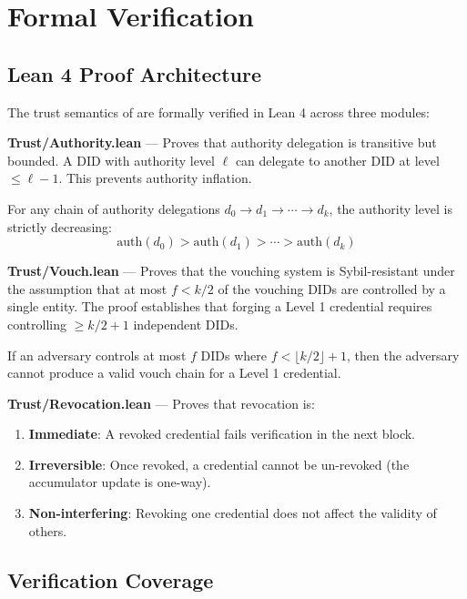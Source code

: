 \section{Formal Verification}


\subsection{Lean 4 Proof Architecture}

The trust semantics of \IChain{} are formally verified in Lean 4 across three modules:

\textbf{Trust/Authority.lean} --- Proves that authority delegation is transitive but bounded. A DID with authority level $\ell$ can delegate to another DID at level $\leq \ell - 1$. This prevents authority inflation.

\begin{theorem}
For any chain of authority delegations $d_0 \to d_1 \to \cdots \to d_k$, the authority level is strictly decreasing:
\[
\text{auth}(d_0) > \text{auth}(d_1) > \cdots > \text{auth}(d_k)
\]
\end{theorem}

\textbf{Trust/Vouch.lean} --- Proves that the vouching system is Sybil-resistant under the assumption that at most $f < k/2$ of the vouching DIDs are controlled by a single entity. The proof establishes that forging a Level 1 credential requires controlling $\geq k/2 + 1$ independent DIDs.

\begin{theorem}
If an adversary controls at most $f$ DIDs where $f < \lfloor k/2 \rfloor + 1$, then the adversary cannot produce a valid vouch chain for a Level 1 credential.
\end{theorem}

\textbf{Trust/Revocation.lean} --- Proves that revocation is:
\begin{enumerate}
\item \textbf{Immediate}: A revoked credential fails verification in the next block.
\item \textbf{Irreversible}: Once revoked, a credential cannot be un-revoked (the accumulator update is one-way).
\item \textbf{Non-interfering}: Revoking one credential does not affect the validity of others.
\end{enumerate}

\subsection{Verification Coverage}


